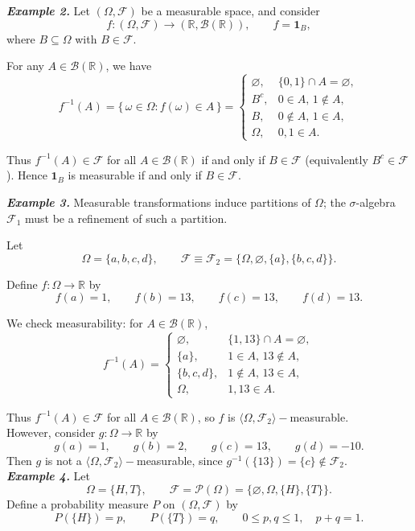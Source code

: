 \documentclass[11pt]{article}
\theoremstyle{definition}
\begin{document}
\noindent
\emph{\textbf{Example 2.}}
Let $(\Omega,\mathcal{F})$ be a measurable space, and consider
\[
f:(\Omega,\mathcal{F}) \to (\mathbb{R},\mathcal{B}(\mathbb{R})), 
\qquad f = \mathbf{1}_B,
\]
where $B \subseteq \Omega$ with $B \in \mathcal{F}$.

For any $A \in \mathcal{B}(\mathbb{R})$, we have
\[
f^{-1}(A) = \{\,\omega \in \Omega : f(\omega) \in A\,\}
=
\begin{cases}
\varnothing, & \{0,1\} \cap A = \varnothing, \\[4pt]
B^c, & 0 \in A,\, 1 \notin A, \\[4pt]
B,   & 0 \notin A,\, 1 \in A, \\[4pt]
\Omega, & 0,1 \in A.
\end{cases}
\]

Thus $f^{-1}(A)\in\mathcal{F}$ for all $A\in\mathcal{B}(\mathbb{R})$
if and only if $B \in \mathcal{F}$ (equivalently $B^c \in \mathcal{F}$).
Hence $\mathbf{1}_B$ is measurable if and only if $B \in \mathcal{F}$.

\noindent
\emph{\textbf{Example 3.}}
Measurable transformations induce partitions of $\Omega$;
the $\sigma$-algebra $\mathcal{F}_1$ must be a refinement of such a partition.

Let
\[
\Omega = \{a,b,c,d\}, \qquad 
\mathcal{F} \equiv \mathcal{F}_2 = \{\Omega, \varnothing, \{a\}, \{b,c,d\}\}.
\]

Define $f:\Omega \to \mathbb{R}$ by
\[
f(a)=1, \qquad f(b)=13, \qquad f(c)=13, \qquad f(d)=13.
\]

We check measurability:
for $A \in \mathcal{B}(\mathbb{R})$,
\[
f^{-1}(A) =
\begin{cases}
\varnothing, & \{1,13\}\cap A = \varnothing, \\[4pt]
\{a\}, & 1 \in A,\, 13 \notin A, \\[4pt]
\{b,c,d\}, & 1 \notin A,\, 13 \in A, \\[4pt]
\Omega, & 1,13 \in A.
\end{cases}
\]

Thus $f^{-1}(A)\in\mathcal{F}$ for all $A \in \mathcal{B}(\mathbb{R})$,
so $f$ is $\langle \Omega, \mathcal{F}_2\rangle-$measurable.
\\
However, consider $g:\Omega \to \mathbb{R}$ by
\[
g(a)=1, \qquad g(b)=2, \qquad g(c)=13, \qquad g(d)=-10.
\]
Then $g$ is not a $\langle \Omega, \mathcal{F}_2\rangle-$measurable, since $g^{-1}(\{13\}) = \{c\} \notin \mathcal{F}_2.$
\\
\emph{\textbf{Example 4.}}
Let 
\[
\Omega = \{H,T\}, \qquad 
\mathcal{F} = \mathcal{P}(\Omega) = \{\varnothing,\Omega,\{H\},\{T\}\}.
\]
Define a probability measure $P$ on $(\Omega,\mathcal{F})$ by
\[
P(\{H\}) = p, \qquad P(\{T\}) = q, \qquad 0 \leq p,q \leq 1, \quad p+q=1.
\]
\end{document}
